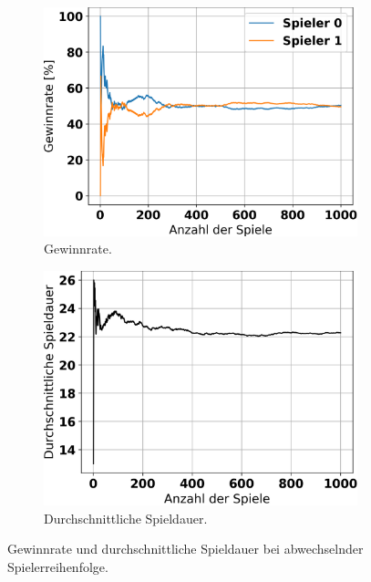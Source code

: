 \begin{figure}[ht!]%
	\begin{subfigure}[b]{0.48\textwidth}
		\includegraphics[width=\textwidth]{Bilder/alternating_player_order_graph_win_rates.png}
		\caption{Gewinnrate.}
		\label{fig:f3}
	\end{subfigure}
	\hfill
	\begin{subfigure}[b]{0.48\textwidth}
		\includegraphics[width=\textwidth]{Bilder/alternating_player_order_graph_game_length.png}
		\caption{Durchschnittliche Spieldauer.}
		\label{fig:f4}
	\end{subfigure}
	\caption{Gewinnrate und durchschnittliche Spieldauer bei abwechselnder Spielerreihenfolge.}
\end{figure}



